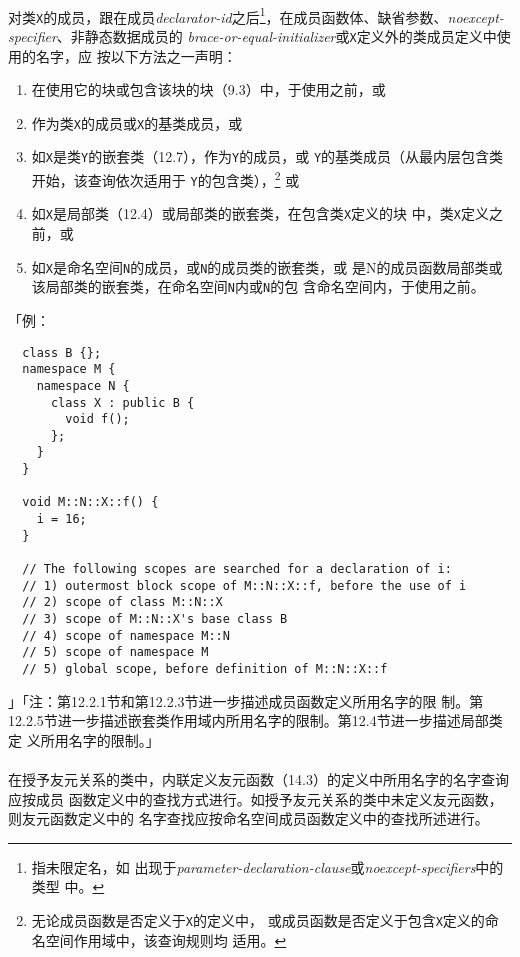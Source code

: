 \paragraph{}
对类\texttt{X}的成员，跟在成员\textit{declarator-id}之后\footnote{指未限定名，如
出现于\textit{parameter-declaration-clause}或\textit{noexcept-specifiers}中的类型
中。}，在成员函数体、缺省参数、\textit{noexcept-specifier}、非静态数据成员的
\textit{brace-or-equal-initializer}或\texttt{X}定义外的类成员定义中使用的名字，应
按以下方法之一声明：
\begin{enumerate}
  \item{在使用它的块或包含该块的块（9.3）中，于使用之前，或}
  \item{作为类\texttt{X}的成员或\texttt{X}的基类成员，或}
  \item{如\texttt{X}是类\texttt{Y}的嵌套类（12.7），作为\texttt{Y}的成员，或
    \texttt{Y}的基类成员（从最内层包含类开始，该查询依次适用于
    \texttt{Y}的包含类），\footnote{无论成员函数是否定义于\texttt{X}的定义中，
      或成员函数是否定义于包含\texttt{X}定义的命名空间作用域中，该查询规则均
      适用。}
    或}
  \item{如\texttt{X}是局部类（12.4）或局部类的嵌套类，在包含类\texttt{X}定义的块
    中，类\texttt{X}定义之前，或}
  \item{如\texttt{X}是命名空间\texttt{N}的成员，或\texttt{N}的成员类的嵌套类，或
    是N的成员函数局部类或该局部类的嵌套类，在命名空间\texttt{N}内或\texttt{N}的包
  含命名空间内，于使用之前。}
\end{enumerate}
「例：
\begin{lstlisting}
  class B {};
  namespace M {
    namespace N {
      class X : public B {
        void f();
      };
    }
  }

  void M::N::X::f() {
    i = 16;
  }

  // The following scopes are searched for a declaration of i:
  // 1) outermost block scope of M::N::X::f, before the use of i
  // 2) scope of class M::N::X
  // 3) scope of M::N::X's base class B
  // 4) scope of namespace M::N
  // 5) scope of namespace M
  // 5) global scope, before definition of M::N::X::f
\end{lstlisting}」「注：第12.2.1节和第12.2.3节进一步描述成员函数定义所用名字的限
制。第12.2.5节进一步描述嵌套类作用域内所用名字的限制。第12.4节进一步描述局部类定
义所用名字的限制。」

\paragraph{}
在授予友元关系的类中，内联定义友元函数（14.3）的定义中所用名字的名字查询应按成员
函数定义中的查找方式进行。如授予友元关系的类中未定义友元函数，则友元函数定义中的
名字查找应按命名空间成员函数定义中的查找所述进行。

